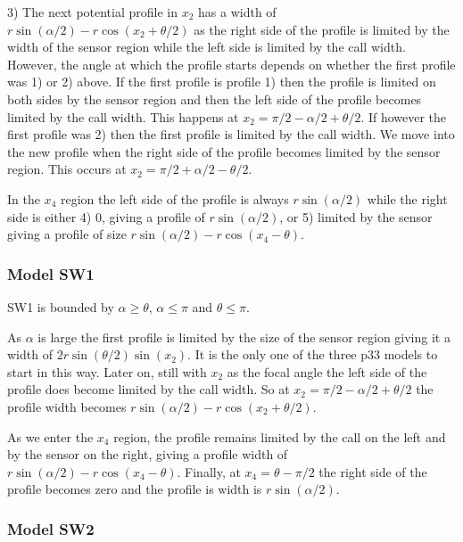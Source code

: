 3) The next potential profile in $x_2$ has a width of $r\sin(\alpha/2) - r\cos(x_2 + \theta/2)$ as the right side of the profile is limited by the width of the sensor region while the left side is limited by the call width. However, the angle at which the profile starts depends on whether the first profile was 1) or 2) above. If the first profile is profile 1) then the profile is limited on both sides by the sensor region and then the left side of the profile becomes limited by the call width. This happens at $x_2 = \pi/2 - \alpha/2 + \theta/2$. If however the first profile was 2) then the first profile is limited by the call width. We move into the new profile when the right side of the profile becomes limited by the sensor region. This occurs at $x_2 = \pi/2 + \alpha/2 - \theta/2$.


In the $x_4$ region the left side of the profile is always $r\sin(\alpha /2)$ while the right side is either 4) 0, giving a profile of $r\sin(\alpha /2)$, or 5) limited by the sensor giving a profile of size $r\sin (\alpha /2) -r\cos(x_4-\theta) $.

\subsubsection{Model SW1} \label{SW1}

SW1 is bounded by $\alpha \ge \theta$, $\alpha \le\pi$ and $\theta \le \pi$.

As $\alpha $ is large the first profile is limited by the size of the sensor region giving it a width of $2r\sin\left(\theta/2\right)\sin(x_2)$. It is the only one of the three p33 models to start in this way. Later on, still with $x_2$ as the focal angle the left side of the profile does become limited by the call width. So at $x_2= \pi/2 - \alpha/2 + \theta/2$ the profile width becomes $r\sin(\alpha/2) - r\cos(x_2 + \theta/2)$. 

As we enter the $x_4$ region, the profile remains limited by the call on the left and by the sensor on the right, giving a profile width of  $r\sin (\alpha /2) -r\cos(x_4-\theta) $. Finally, at $x_4 = \theta - \pi/2$ the right side of the profile becomes zero and the profile is width is $r\sin(\alpha /2)$.



\subsubsection{Model SW2} \label{SW2}

